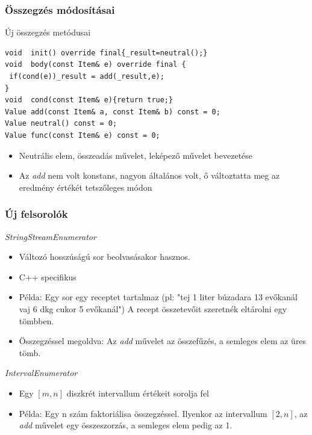 \documentclass[11pt]{beamer}
\begin{document}
\begin{frame}[fragile]
	\frametitle{Összegzés módosításai}
	\begin{block}{Új összegzés metódusai}
	\begin{lstlisting}[basicstyle=\small]
void  init() override final{_result=neutral();}
void  body(const Item& e) override final {
 if(cond(e))_result = add(_result,e);
}
void  cond(const Item& e){return true;}
Value add(const Item& a, const Item& b) const = 0;
Value neutral() const = 0;
Value func(const Item& e) const = 0;

	\end{lstlisting}
	\end{block}
	
	\begin{itemize}
	\item Neutrális elem, összeadás művelet, leképező művelet bevezetése
	\item Az \textit{add} nem volt konstans, nagyon általános volt, ő változtatta meg az eredmény értékét tetszőleges módon
	\end{itemize}
\end{frame}

\begin{frame}
	\frametitle{Új felsorolók}
		 \textit{StringStreamEnumerator} 
		 \begin{itemize}
		 	\item Változó hosszúságú sor beolvasásakor hasznos.
		 	\item C++ specifikus
		 	\item Példa: Egy sor egy receptet tartalmaz (pl: "tej 1 liter búzadara 13 evőkanál vaj 6 dkg cukor 5 evőkanál") A recept összetevőit szeretnék eltárolni egy tömbben.
		 	\item Összegzéssel megoldva: Az \textit{add} művelet az összefűzés, a semleges elem az üres tömb.
		 \end{itemize}
		
		\textit{IntervalEnumerator}
		\begin{itemize}
			\item Egy $[m,n]$ diszkrét intervallum értékeit sorolja fel
			\item Példa: Egy n szám faktoriálisa összegzéssel. Ilyenkor az intervallum $[2,n]$, az \textit{add} művelet egy összeszorzás, a semleges elem pedig az 1.
		\end{itemize}
		
\end{frame}
\end{document}
